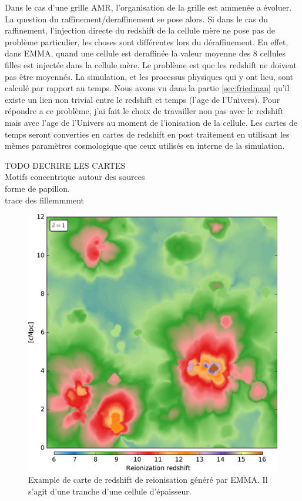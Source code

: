 Dans le cas d'une grille AMR, l'organisation de la grille est ammenée a évoluer.
La question du raffinement/deraffinement  se pose alors.
Si dans le cas du raffinement, l'injection directe du redshift de la cellule mère ne pose pas de problème particulier, les choses sont différentes lors du déraffinement.
En effet, dans EMMA, quand une cellule est deraffinée la valeur moyenne des 8 cellules filles est injectée dans la cellule mère.
Le problème est que les redshift ne doivent pas être moyennés.
La simulation, et les processus physiques qui y ont lieu, sont calculé par rapport au temps.
Nous avons vu dans la partie \ref{sec:friedman} qu'il existe un lien non trivial entre le redshift et temps (l'age de l'Univers).
Pour répondre a ce problème, j'ai fait le choix de travailler non pas avec le redshift mais avec l'age de l'Univers au moment de l'ionisation de la cellule.
Les cartes de temps seront converties en cartes de redshift en post traitement en utilisant les mèmes paramètres cosmologique que ceux utilisés en interne de la simulation.

TODO DECRIRE LES CARTES\\

Motifs concentrique autour des sources\\

forme de papillon.\\

trace des fillemmment\\


\begin{figure}[htpb]
        \includegraphics[width=.95\linewidth]{img/04_mapreio/map_z_c1.pdf} 
        \caption{Example de carte de redshift de reionisation généré par EMMA.
        Il s'agit d'une tranche d'une cellule d'épaisseur.
        }
 		\label{fig:zmap}
\end{figure}

